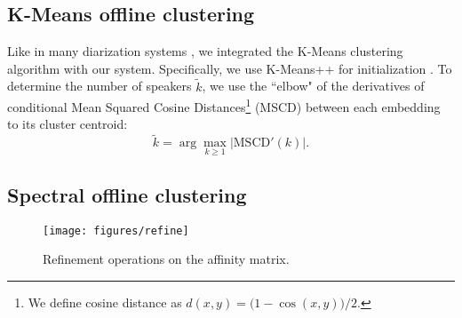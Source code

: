 \documentclass{article}
\begin{document}
\subsection{K-Means offline clustering}
\label{sec:kmeans}

Like in many diarization systems \cite{ben2012initialization,shum2013unsupervised,dimitriadis2017developing},
we integrated the K-Means clustering algorithm with our system. Specifically,
we use K-Means++ for initialization \cite{arthur2007k}.
To determine the number of speakers $\widetilde{k}$,
we use the ``elbow" of the derivatives of
conditional Mean Squared Cosine Distances\footnote{We define cosine distance as $d(x,y)=\big(1-\cos(x,y)\big)/2$.}
(MSCD) between each embedding to its
cluster centroid:
\begin{equation}
\widetilde{k}=\arg\max_{k \geq 1} | \mathrm{MSCD} ' (k) | .
\end{equation}


\subsection{Spectral offline clustering}
\label{spectral}

\begin{figure*}
  \vspace{-5pt}
  \centering
    \texttt{[image: figures/refine]}
  \caption{Refinement operations on the affinity matrix.}
  \label{fig:refine}
  \vspace{-10pt}
\end{figure*}
\end{document}
